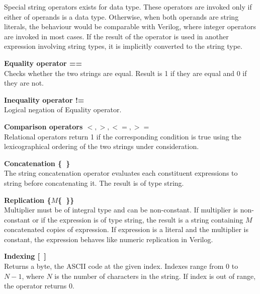 Special string operators exists for \kwstring data type. These
operators are invoked only if either of operands is a \kwstring data
type. Otherwise, when both operands are string literals, the behaviour
would be comparable with Verilog, where integer operators are invoked
in most cases. If the result of the operator is used in another
expression involving string types, it is implicitly converted to the
string type.
\begin{description}
\item{{\bf Equality operator ==}} \hfill \\ Checks whether the two
  strings are equal. Result is 1 if they are equal and 0 if they are
  not.
\item{{\bf Inequality operator !=}} \hfill \\ Logical negation of
  Equality operator.
\item{{\bf Comparison operators $<, >, <=, >=$}} \hfill \\ Relational
  operators return 1 if the corresponding condition is true using the
  lexicographical ordering of the two strings under consideration.
\item{{\bf Concatenation \{~\}}} \hfill \\ The string concatenation
  operator evaluates each constituent expressions to string before
  concatenating it. The result is of type string.
\item {{\bf Replication \{$M$\{~\}\}}} \hfill \\ Multiplier must be of
  integral type and can be non-constant. If multiplier is non-constant
  or if the expression is of type string, the result is a string
  containing $M$ concatenated copies of expression. If expression is a
  literal and the multiplier is constant, the expression behaves like
  numeric replication in Verilog.
\item {{\bf Indexing [~]}} \hfill \\ Returns a byte, the ASCII code at
  the given index. Indexes range from $0$ to $N-1$, where $N$ is the
  number of characters in the string. If index is out of range, the
  operator returns $0$.
\end{description}

